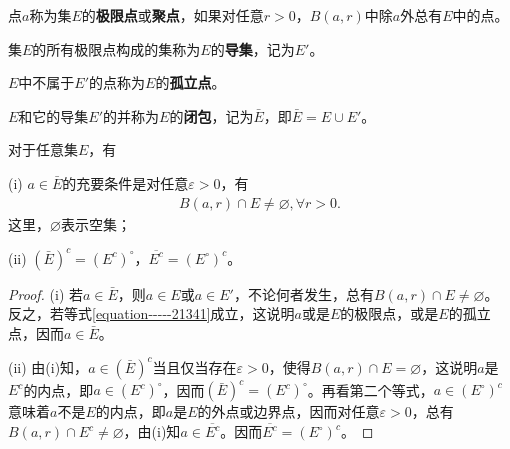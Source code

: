 \documentclass[../../main.tex]{subfiles}
\begin{document}
\begin{definition}
点\(a\)称为集\(E\)的\textbf{极限点}或\textbf{聚点}，如果对任意\(r > 0\)，\(B(a, r)\)中除\(a\)外总有\(E\)中的点。

集\(E\)的所有极限点构成的集称为\(E\)的\textbf{导集}，记为\(E'\)。

\(E\)中不属于\(E'\)的点称为\(E\)的\textbf{孤立点}。

\(E\)和它的导集\(E'\)的并称为\(E\)的\textbf{闭包}，记为\(\bar{E}\)，即\(\bar{E} = E \cup E'\)。
\end{definition}

\begin{proposition}\label{proposition:闭包的性质}
对于任意集\(E\)，有

(i) \(a \in \bar{E}\)的充要条件是对任意\(\varepsilon > 0\)，有
\begin{align}
B(a, r) \cap E \neq \varnothing,\forall r>0.\label{equation-----21341}
\end{align}
这里，\(\varnothing\)表示空集；

(ii) \((\bar{E})^c = (E^c)^\circ\)，\(\overline{E^c} = (E^\circ)^c\)。
\end{proposition}
\begin{proof}
(i) 若\(a \in \bar{E}\)，则\(a \in E\)或\(a \in E'\)，不论何者发生，总有\(B(a, r) \cap E \neq \varnothing\)。反之，若等式\eqref{equation-----21341}成立，这说明\(a\)或是\(E\)的极限点，或是\(E\)的孤立点，因而\(a \in \bar{E}\)。

(ii) 由(i)知，\(a \in (\bar{E})^c\)当且仅当存在\(\varepsilon > 0\)，使得\(B(a, r) \cap E = \varnothing\)，这说明\(a\)是\(E^c\)的内点，即\(a \in (E^c)^\circ\)，因而\((\bar{E})^c = (E^c)^\circ\)。再看第二个等式，\(a \in (E^\circ)^c\)意味着\(a\)不是\(E\)的内点，即\(a\)是\(E\)的外点或边界点，因而对任意\(\varepsilon > 0\)，总有\(B(a, r) \cap E^c \neq \varnothing\)，由(i)知\(a \in \overline{E^c}\)。因而\(\overline{E^c} = (E^\circ)^c\)。 

\end{proof}
\end{document}

